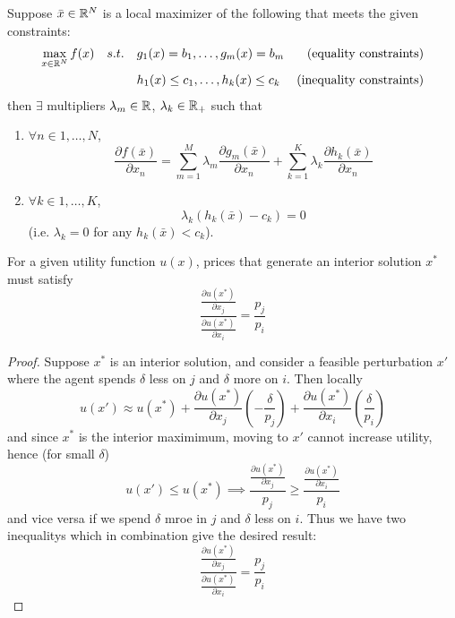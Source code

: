 
\begin{theorem}
  Suppose $\bar x \in {\mathbb R}^N$ is a local maximizer of the following that
  meets the given constraints:
  \begin{align}
    \max_{x \in {\mathbb R}^N} f(x) \quad s.t. \quad 
    & g_1(x) = b_1, \dots, g_m(x) = b_m & \text{(equality constraints)} \notag \\
    & h_1(x) \leq c_1, \dots, h_k(x) \leq c_k & \text{(inequality constraints)} \notag
  \end{align}
  then $\exists$ multipliers $\lambda_m \in {\mathbb R}$, $\lambda_k \in {\mathbb R}_+$
  such that
  \begin{enumerate}[(1)]
  \item $\forall n \in 1, \dots, N$,
    \[
    \frac{\partial f(\bar x)}{\partial x_n} 
    = \sum_{m=1}^M \lambda_m \frac{\partial g_m(\bar x)}{\partial x_n}
    + \sum_{k=1}^K \lambda_k \frac{\partial h_k(\bar x)}{\partial x_n}
    \]

  \item $\forall k \in 1, \dots, K$,
    \[
    \lambda_k(h_k(\bar x) - c_k) = 0
    \]
    (i.e. $\lambda_k = 0$ for any $h_k(\bar x) < c_k$).
  \end{enumerate}
\end{theorem}

\begin{prop}
  For a given utility function $u(x)$, prices that generate an
  interior solution $x^*$ must satisfy
  \[
  \frac{
    \frac{\partial u(x^*)}{\partial x_j}
  } {
    \frac{\partial u(x^*)}{\partial x_i}
  }
  = \frac{p_j}{p_i}
  \]
\end{prop}

\begin{proof}
  Suppose $x^*$ is an interior solution, and consider a feasible
  perturbation $x'$ where the agent spends $\delta$ less on $j$ and
  $\delta$ more on $i$. Then locally
  \[
  u(x') \approx u(x^*) 
  + \frac{\partial u(x^*)}{\partial x_j}\left(-\frac{\delta}{p_j}\right)
  + \frac{\partial u(x^*)}{\partial x_i}\left(\frac{\delta}{p_i}\right)
  \]
  and since $x^*$ is the interior maximimum, moving to $x'$ cannot
  increase utility, hence (for small $\delta$)
  \[
  u(x') \leq u(x^*) \implies
  \frac{\frac{\partial u(x^*)}{\partial x_j}}{p_j}
  \geq \frac{\frac{\partial u(x^*)}{\partial x_i}}{p_i}
  \]
  and vice versa if we spend $\delta$ mroe in $j$ and $\delta$ less on
  $i$. Thus we have two inequalitys which in combination give the
  desired result:
  \[
  \frac{
    \frac{\partial u(x^*)}{\partial x_j}
  } {
    \frac{\partial u(x^*)}{\partial x_i}
  }
  = \frac{p_j}{p_i}
  \]
\end{proof}


